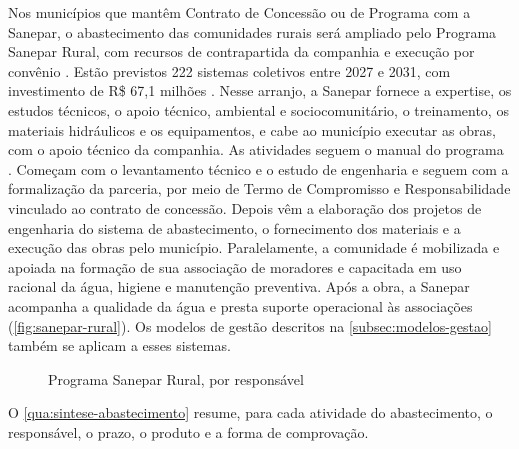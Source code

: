 Nos municípios que mantêm Contrato de Concessão ou de Programa com a Sanepar,
o abastecimento das comunidades rurais será ampliado pelo Programa Sanepar
Rural, com recursos de contrapartida da companhia e execução por convênio
\cite{mop2026}. Estão previstos 222 sistemas coletivos entre 2027 e 2031, com
investimento de R\$ 67,1 milhões \cite{custo2026}. Nesse arranjo, a Sanepar fornece a expertise, os estudos técnicos, o apoio técnico, ambiental e
sociocomunitário, o treinamento, os materiais hidráulicos e os equipamentos,
e cabe ao município executar as obras, com o apoio técnico da companhia. As atividades
seguem o manual do programa \cite{saneparrural}. Começam com o levantamento
técnico e o estudo de engenharia e seguem com a formalização da parceria, por
meio de Termo de Compromisso e Responsabilidade vinculado ao contrato de
concessão. Depois vêm a elaboração dos projetos de engenharia do sistema de
abastecimento, o fornecimento dos materiais e a execução das obras pelo
município. Paralelamente, a comunidade é mobilizada e apoiada na formação de
sua associação de moradores e capacitada em uso racional da água, higiene e
manutenção preventiva. Após a obra, a Sanepar acompanha a qualidade da água e
presta suporte operacional às associações (\autoref{fig:sanepar-rural}). Os
modelos de gestão descritos na \autoref{subsec:modelos-gestao} também se
aplicam a esses sistemas.

\begin{figure}[htbp]
  \centering
  \caption{Programa Sanepar Rural, por responsável}
  \label{fig:sanepar-rural}
\end{figure}


O \autoref{qua:sintese-abastecimento} resume, para cada atividade do
abastecimento, o responsável, o prazo, o produto e a forma de comprovação.

